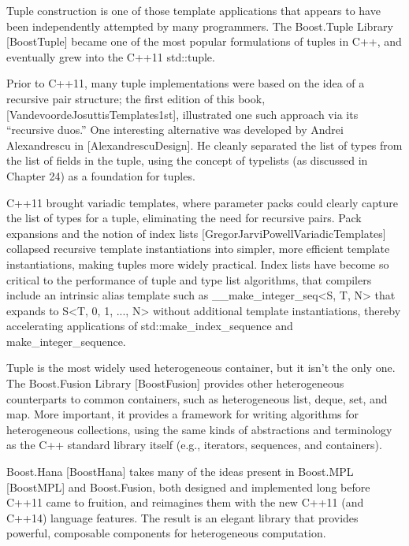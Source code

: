 Tuple construction is one of those template applications that appears to have been independently attempted by many programmers. The Boost.Tuple Library [BoostTuple] became one of the most popular formulations of tuples in C++, and eventually grew into the C++11 std::tuple.

Prior to C++11, many tuple implementations were based on the idea of a recursive pair structure; the first edition of this book, [VandevoordeJosuttisTemplates1st], illustrated one such approach via its “recursive duos.” One interesting alternative was developed by Andrei Alexandrescu in [AlexandrescuDesign]. He cleanly separated the list of types from the list of fields in the tuple, using the concept of typelists (as discussed in Chapter 24) as a foundation for tuples.

C++11 brought variadic templates, where parameter packs could clearly capture the list of types for a tuple, eliminating the need for recursive pairs. Pack expansions and the notion of index lists [GregorJarviPowellVariadicTemplates] collapsed recursive template instantiations into simpler, more efficient template instantiations, making tuples more widely practical. Index lists have become so critical to the performance of tuple and type list algorithms, that compilers include an intrinsic alias template such as \_\_make\_integer\_seq<S, T, N> that expands to S<T, 0, 1, ..., N> without additional template instantiations, thereby accelerating applications of std::make\_index\_sequence and make\_integer\_sequence.

Tuple is the most widely used heterogeneous container, but it isn’t the only one. The Boost.Fusion Library [BoostFusion] provides other heterogeneous counterparts to common containers, such as heterogeneous list, deque, set, and map. More important, it provides a framework for writing algorithms for heterogeneous collections, using the same kinds of abstractions and terminology as the C++ standard library itself (e.g., iterators, sequences, and containers).

Boost.Hana [BoostHana] takes many of the ideas present in Boost.MPL [BoostMPL] and Boost.Fusion, both designed and implemented long before C++11 came to fruition, and reimagines them with the new C++11 (and C++14) language features. The result is an elegant library that provides powerful, composable components for heterogeneous computation.